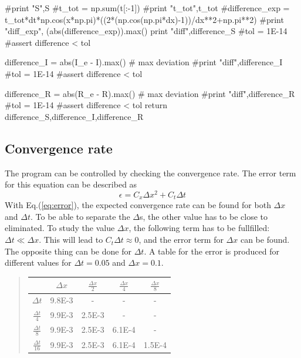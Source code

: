 \documentclass[%
twoside,                 %
final,                   %
10pt]{article}
\begin{document}
    #print "S",S
    #t_tot = np.sum(t[:-1])
    #print "t_tot",t_tot
    #difference_exp = t_tot*dt*np.cos(x*np.pi)*((2*(np.cos(np.pi*dx)-1))/dx**2+np.pi**2)
    #print "diff_exp", (abs(difference_exp)).max()
    print "diff",difference_S
    #tol = 1E-14
    #assert difference < tol
    
    difference_I = abs(I_e - I).max()  # max deviation
    #print "diff",difference_I
    #tol = 1E-14
    #assert difference < tol
   
    difference_R = abs(R_e - R).max()  # max deviation
    #print "diff",difference_R
    #tol = 1E-14
    #assert difference < tol
    return difference_S,difference_I,difference_R
\epycod

\subsection{Convergence rate}
The program can be controlled by checking the convergence rate. The error term  for this equation can be described as  
\begin{equation} \label{eq:error}
    \epsilon = C_x\Delta x^2 + C_t \Delta t
\end{equation}
With Eq.(\ref{eq:error}), the expected convergence rate can be found for both $\Delta x$ and $\Delta t$. To be able to separate the $\Delta$s, the other value has to be close to eliminated. To study the value $\Delta x$, the following term has to be fullfilled: $\Delta t \ll \Delta x$. This will lead to $C_t\Delta t \approx 0$, and the error term for $\Delta x$ can be found. The opposite thing can  be done for $\Delta t$. A table for the error is produced for different values for $\Delta t = 0.05$ and $\Delta x=0.1$.

\label{table:error_numbers}

\begin{quote}
\begin{tabular}{ccccc}
\hline
\multicolumn{1}{c}{  } & \multicolumn{1}{c}{ $\Delta x$ } & \multicolumn{1}{c}{ $\frac{\Delta x}{2}$ } & \multicolumn{1}{c}{ $\frac{\Delta x}{4}$ } & \multicolumn{1}{c}{ $\frac{\Delta x}{8}$ } \\
\hline
$\Delta t     $       & 9.8E-3     & -                    & -                    & -                    \\
$\frac{\Delta t}{4} $ & 9.9E-3     & 2.5E-3               & -                    & -                    \\
$\frac{\Delta t}{8} $ & 9.9E-3     & 2.5E-3               & 6.1E-4               & -                    \\
$\frac{\Delta t}{16}$ & 9.9E-3     & 2.5E-3               & 6.1E-4               & 1.5E-4               \\
\hline
\end{tabular}
\end{quote}
\end{document}
